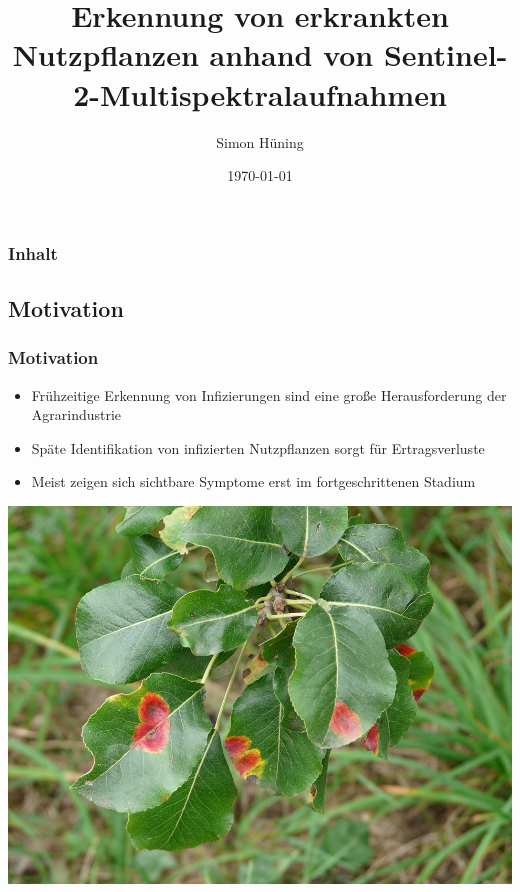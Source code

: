 \documentclass{beamer}
\title[Erkennung von erkrankten Nutzpflanzen]{Erkennung von erkrankten Nutzpflanzen anhand von Sentinel-2-Multispektralaufnahmen} %
\author{Simon Hüning} %
\institute[] %
{
Universität Leipzig \\ %
\medskip
}
\date{\today} %
\begin{document}
\begin{frame}
\titlepage %
\end{frame}

\begin{frame}
\frametitle{Inhalt} %
\tableofcontents %
\end{frame}


\begin{frame}\section{Motivation}\frametitle{Motivation}
\begin{minipage}{0.5\textwidth}
	\begin{itemize}
		\item Frühzeitige Erkennung von Infizierungen sind eine große Herausforderung der Agrarindustrie
		\item Späte Identifikation von infizierten Nutzpflanzen sorgt für Ertragsverluste
		\item Meist zeigen sich sichtbare Symptome erst im fortgeschrittenen Stadium
	\end{itemize}
\end{minipage}
\hspace{1em}
\begin{minipage}{0.4\textwidth}
	\includegraphics[width=1\linewidth]{pics/befall.png}
\end{minipage}
\end{frame}
\end{document}
